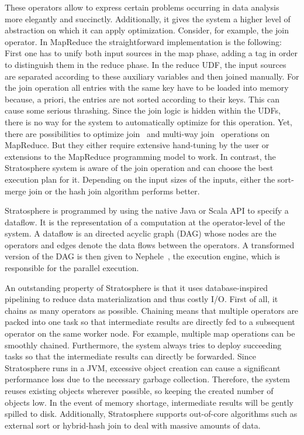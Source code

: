 These operators allow to express certain problems occurring in data analysis more elegantly and succinctly.
Additionally, it gives the system a higher level of abstraction on which it can apply optimization.
Consider, for example, the join operator.
In MapReduce the straightforward implementation is the following:
First one has to unify both input sources in the map phase, adding a tag in order to distinguish them in the reduce phase.
In the reduce UDF, the input sources are separated according to these auxiliary variables and then joined manually.
For the join operation all entries with the same key have to be loaded into memory because, a priori, the entries are not sorted according to their keys.
This can cause some serious thrashing.
Since the join logic is hidden within the UDFs, there is no way for the system to automatically optimize for this operation.
Yet, there are possibilities to optimize join~\cite{blanas:2010a} and multi-way join~\cite{afrati:2010a} operations on MapReduce.
But they either require extensive hand-tuning by the user or extensions to the MapReduce programming model to work.
In contrast, the Stratosphere system is aware of the join operation and can choose the best execution plan for it.
Depending on the input sizes of the inputs, either the sort-merge join or the hash join algorithm performs better.

Stratosphere is programmed by using the native Java or Scala API to specify a dataflow.
It is the representation of a computation at the operator-level of the system.
A dataflow is an directed acyclic graph (DAG) whose nodes are the operators and edges denote the data flows between the operators.
A transformed version of the DAG is then given to Nephele~\cite{warneke:2009a}, the execution engine, which is responsible for the parallel execution.

An outstanding property of Stratosphere is that it uses database-inspired pipelining to reduce data materialization and thus costly I/O.
First of all, it chains as many operators as possible.
Chaining means that multiple operators are packed into one task so that intermediate results are directly fed to a subsequent operator on the same worker node.
For example, multiple map operations can be smoothly chained.
Furthermore, the system always tries to deploy succeeding tasks so that the intermediate results can directly be forwarded.
Since Stratosphere runs in a JVM, excessive object creation can cause a significant performance loss due to the necessary garbage collection.
Therefore, the system reuses existing objects wherever possible, so keeping the created number of objects low.
In the event of memory shortage, intermediate results will be gently spilled to disk.
Additionally, Stratosphere supports out-of-core algorithms such as external sort or hybrid-hash join to deal with massive amounts of data.

